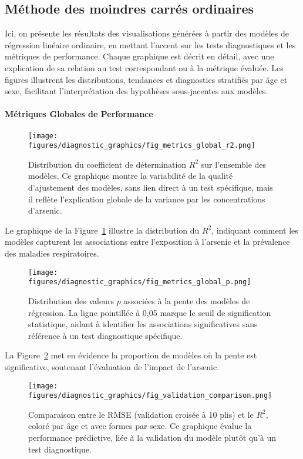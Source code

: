 \subsection{Méthode des moindres carrés ordinaires}

Ici, on présente les résultats des visualisations générées à partir des modèles de régression linéaire ordinaire, en mettant l'accent sur les tests diagnostiques et les métriques de performance. Chaque graphique est décrit en détail, avec une explication de sa relation au test correspondant ou à la métrique évaluée. Les figures illustrent les distributions, tendances et diagnostics stratifiés par âge et sexe, facilitant l'interprétation des hypothèses sous-jacentes aux modèles.

\paragraph{Métriques Globales de Performance}

\begin{figure}[H]
	\centering
	\texttt{[image: figures/diagnostic\_graphics/fig\_metrics\_global\_r2.png]}
	\caption{Distribution du coefficient de détermination $R^2$ sur l'ensemble des modèles. Ce graphique montre la variabilité de la qualité d'ajustement des modèles, sans lien direct à un test spécifique, mais il reflète l'explication globale de la variance par les concentrations d'arsenic.}
	\label{fig:global_r2}
\end{figure}

Le graphique de la Figure~\ref{fig:global_r2} illustre la distribution du $R^2$, indiquant comment les modèles capturent les associations entre l'exposition à l'arsenic et la prévalence des maladies respiratoires.

\begin{figure}[H]
	\centering
	\texttt{[image: figures/diagnostic\_graphics/fig\_metrics\_global\_p.png]}
	\caption{Distribution des valeurs $p$ associées à la pente des modèles de régression. La ligne pointillée à 0,05 marque le seuil de signification statistique, aidant à identifier les associations significatives sans référence à un test diagnostique spécifique.}
	\label{fig:global_p}
\end{figure}

La Figure~\ref{fig:global_p} met en évidence la proportion de modèles où la pente est significative, soutenant l'évaluation de l'impact de l'arsenic.

\begin{figure}[H]
	\centering
	\texttt{[image: figures/diagnostic\_graphics/fig\_validation\_comparison.png]}
	\caption{Comparaison entre le RMSE (validation croisée à 10 plis) et le $R^2$, coloré par âge et avec formes par sexe. Ce graphique évalue la performance prédictive, liée à la validation du modèle plutôt qu'à un test diagnostique.}
	\label{fig:val_comp}
\end{figure}

